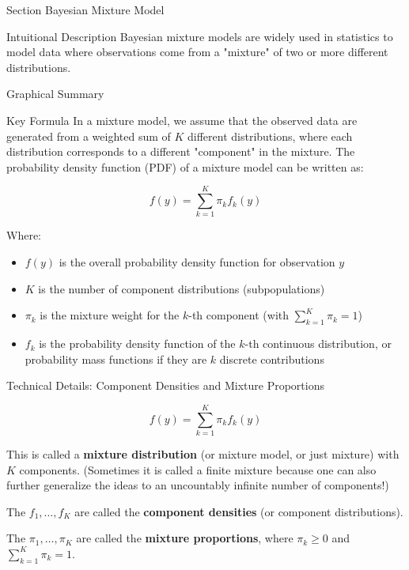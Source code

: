 
\begin{frame}{Section}
\centering
\Huge{Bayesian Mixture Model}
\end{frame}


\begin{frame}{Intuitional Description}
Bayesian mixture models are widely used in statistics to model data where observations come from a "mixture" of two or more different distributions.
\end{frame}

\begin{frame}{Graphical Summary}

\end{frame}


\begin{frame}{Key Formula}
In a mixture model, we assume that the observed data are generated from a weighted sum of $K$ different distributions, where each distribution corresponds to a different "component" in the mixture. The probability density function (PDF) of a mixture model can be written as:

$$
f(y) = \sum_{k=1}^{K} \pi_k f_k(y)
$$

Where:

\begin{itemize}
\item $f(y)$ is the overall probability density function for observation $y$
\item $K$ is the number of component distributions (subpopulations)
\item $\pi_k$ is the mixture weight for the $k$-th component (with $\sum_{k=1}^{K} \pi_k = 1$)
\item $f_k$ is the probability density function of the $k$-th continuous distribution, or probability mass functions if they are $k$ discrete contributions
\end{itemize}

\end{frame}


\begin{frame}{Technical Details: Component Densities and Mixture Proportions}

$$
f(y) = \sum_{k=1}^{K} \pi_k f_k(y)
$$

This is called a \textbf{mixture distribution} (or mixture model, or just mixture) with $K$ components. (Sometimes it is called a finite mixture because one can also further generalize the ideas to an uncountably infinite number of components!)

The $f_1,…,f_K$ are called the \textbf{component densities} (or component distributions).

The $\pi_1,…,\pi_K$ are called the \textbf{mixture proportions}, where $\pi_k \geq 0$ and $\sum_{k=1}^K \pi_k=1$.

\end{frame}


